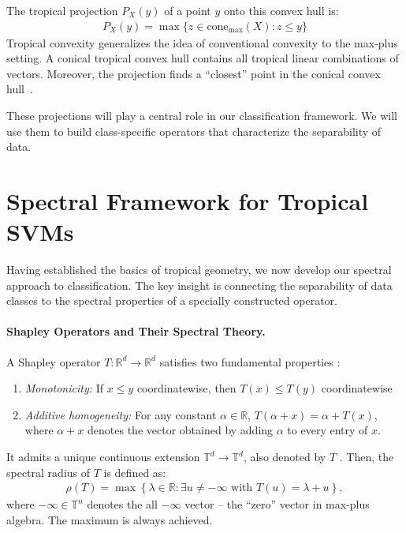\documentclass{article}
\newcommand{\R}{\mathbb{R}}
\newcommand{\T}{\mathbb{T}}
\begin{document}
The tropical projection $P_X(y)$ of a point $y$ onto this convex hull is:
\begin{align}
P_X(y) = \max\{z \in \text{cone}_{\max}(X) : z \leq y\}
\end{align}
Tropical convexity generalizes the idea of conventional convexity to the max-plus setting. A conical tropical convex hull contains all tropical linear combinations of vectors. Moreover, the projection finds a ``closest'' point in the conical convex hull~\cite{AGNS10}.

These projections will play a central role in our classification framework. We will use them to build class-specific operators that characterize the separability of data.

\section{Spectral Framework for Tropical SVMs}\label{sec:spectral}

Having established the basics of tropical geometry, we now develop our spectral approach to classification. The key insight is connecting the separability of data classes to the spectral properties of a specially constructed operator.

\paragraph{Shapley Operators and Their Spectral Theory.}
A Shapley operator $T: \R^d \to \R^d$ satisfies two fundamental properties \cite{kolokoltsov1992}:
\begin{enumerate}
    \item \textit{Monotonicity:} If $x \leq y$ coordinatewise, then $T(x) \leq T(y)$ coordinatewise
    \item \textit{Additive homogeneity:} For any constant $\alpha \in \R$, $T(\alpha + x) = \alpha + T(x)$,
      where $\alpha +x$ denotes the vector obtained by adding $\alpha$ to every entry of $x$.
\end{enumerate}
It admits a unique continuous extension $\T^d\to \T^d$, also denoted by $T$ \cite{akian_correspondence_2011}. Then, the spectral radius of $T$ is defined as:
\begin{align}
\rho(T) = \max\left\{\lambda \in \R : \exists u \neq -\infty \text{ with } T(u) = \lambda + u\right\},
\end{align}
where $-\infty\in \T^n$ denotes the all $-\infty$ vector -- the ``zero'' vector in max-plus algebra.
The maximum is always achieved.
\end{document}
